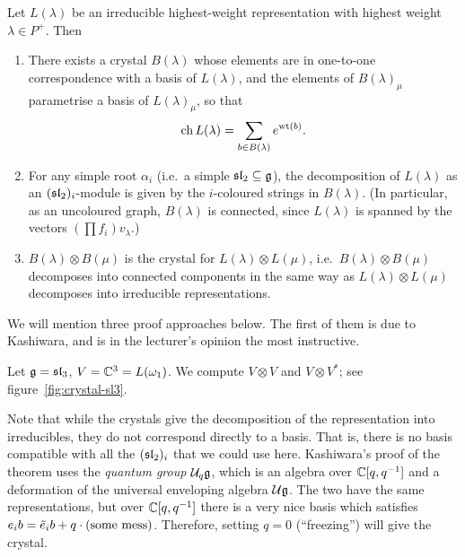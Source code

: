 \begin{theorem}[Kashiwara]
Let $L(\lambda)$ be an irreducible highest-weight representation with highest
weight $\lambda \in P^+$. Then
\begin{enumerate}
  \item There exists a crystal $B(\lambda)$ whose elements are in one-to-one
    correspondence with a basis of $L(\lambda)$, and the elements of
    $B(\lambda)_\mu$ parametrise a basis of $L(\lambda)_\mu$, so that
    \[
      \ch L(\lambda) = \sum_{b \in B(\lambda)} e^{\wt(b)}.
    \]
  \item For any simple root $\alpha_i$ (i.e.\ a simple $\sl_2 \subseteq \g$),
    the decomposition of $L(\lambda)$ as an $(\sl_2)_i$-module is given by the
    $i$-coloured strings in $B(\lambda)$. (In particular, as an uncoloured
    graph, $B(\lambda)$ is connected, since $L(\lambda)$ is spanned by the
    vectors $(\prod f_i)v_\lambda$.)
  \item $B(\lambda) \otimes B(\mu)$ is the crystal for
    $L(\lambda) \otimes L(\mu)$, i.e.\ $B(\lambda) \otimes B(\mu)$ decomposes
    into connected components in the same way as $L(\lambda) \otimes L(\mu)$
    decomposes into irreducible representations.
\end{enumerate}
\end{theorem}

\begin{remark}
We will mention three proof approaches below. The first of them is due to
Kashiwara, and is in the lecturer's opinion the most instructive.
\end{remark}

\begin{example}
Let $\g = \sl_3$, $V = \C^3 = L(\omega_1)$. We compute $V \otimes V$ and
$V \otimes V^*$; see figure~\ref{fig:crystal-sl3}.
\end{example}

\begin{remark}
Note that while the crystals give the decomposition of the representation
into irreducibles, they do not correspond directly to a basis. That is, there
is no basis compatible with all the $(\sl_2)_i$ that we could use here.
Kashiwara's proof of the theorem uses the \emph{quantum group} $\U_q\g$, which
is an algebra over $\C[q, q^{-1}]$ and a deformation of the universal
enveloping algebra $\U\g$. The two have the same representations, but over
$\C[q, q^{-1}]$ there is a very nice basis which satisfies
$e_ib = \te_ib + q \cdot (\text{some mess})$. Therefore, setting $q = 0$
(``freezing'') will give the crystal.
\end{remark}

